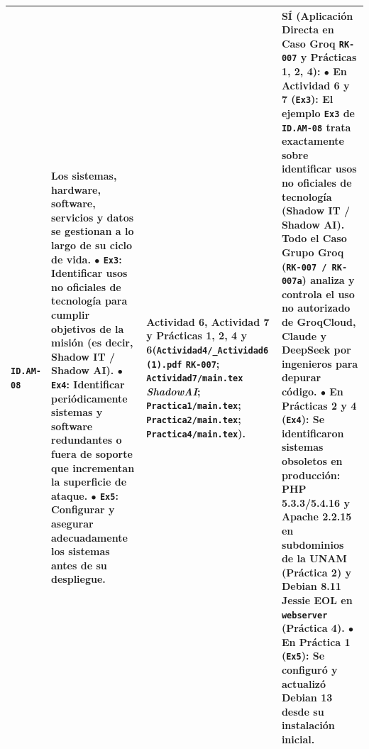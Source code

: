\documentclass[letterpaper,11pt]{article}
\begin{document}
\begin{longtable}{|C{1.5cm}|L{5.3cm}|L{4.3cm}|L{5.8cm}|}
\texttt{ID.AM-08} &
\textbf{Los sistemas, hardware, software, servicios y datos se gestionan a lo largo de su ciclo de vida.}\newline
$\bullet$ \texttt{Ex3}: \textbf{Identificar usos no oficiales de tecnología para cumplir objetivos de la misión (es decir, Shadow IT / Shadow AI)}.\newline
$\bullet$ \texttt{Ex4}: Identificar periódicamente sistemas y software redundantes o fuera de soporte que incrementan la superficie de ataque.\newline
$\bullet$ \texttt{Ex5}: Configurar y asegurar adecuadamente los sistemas antes de su despliegue. &
\textbf{Actividad 6, Actividad 7 y Prácticas 1, 2, 4 y 6}\newline (\texttt{Actividad4/\_Actividad6 (1).pdf} \texttt{RK-007}; \texttt{Actividad7/main.tex} \textit{ShadowAI}; \texttt{Practica1/main.tex}; \texttt{Practica2/main.tex}; \texttt{Practica4/main.tex}). &
\textbf{SÍ (Aplicación Directa en Caso Groq \texttt{RK-007} y Prácticas 1, 2, 4):}\newline
$\bullet$ \textbf{En Actividad 6 y 7 (\texttt{Ex3}):} El ejemplo \texttt{Ex3} de \texttt{ID.AM-08} trata exactamente sobre identificar usos no oficiales de tecnología (\textbf{Shadow IT / Shadow AI}). Todo el Caso Grupo Groq (\texttt{RK-007 / RK-007a}) analiza y controla el uso no autorizado de GroqCloud, Claude y DeepSeek por ingenieros para depurar código.\newline
$\bullet$ \textbf{En Prácticas 2 y 4 (\texttt{Ex4}):} Se identificaron sistemas obsoletos en producción: PHP 5.3.3/5.4.16 y Apache 2.2.15 en subdominios de la UNAM (Práctica 2) y Debian 8.11 Jessie EOL en \texttt{webserver} (Práctica 4).\newline
$\bullet$ \textbf{En Práctica 1 (\texttt{Ex5}):} Se configuró y actualizó Debian 13 desde su instalación inicial. \\
\hline


\end{longtable}
\end{document}
